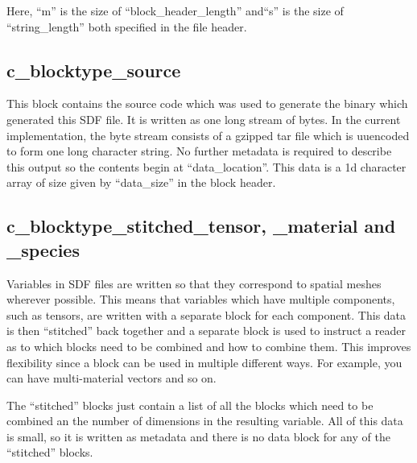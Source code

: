 \documentclass[12pt]{article}
\begin{document}
Here, ``m'' is the size of ``block\_header\_length'' and``s'' is the size of
``string\_length'' both specified in the file header.

\subsection{c\_blocktype\_source}

This block contains the source code which was used to generate the binary
which generated this SDF file. It is written as one long stream of bytes.
In the current implementation, the byte stream consists of a gzipped
tar file which is uuencoded to form one long character string. No further
metadata is required to describe this output so the contents begin at
``data\_location''. This data is a 1d character array of size given by
``data\_size'' in the block header.


\subsection{c\_blocktype\_stitched\_tensor, \_material and \_species}

Variables in SDF files are written so that they correspond to spatial meshes
wherever possible. This means that variables which have multiple components,
such as tensors, are written with a separate block for each component. This
data is then ``stitched'' back together and a separate block is used to
instruct a reader as to which blocks need to be combined and how to combine
them. This improves flexibility since a block can be used in multiple different
ways. For example, you can have multi-material vectors and so on.

The ``stitched'' blocks just contain a list of all the blocks which need to
be combined an the number of dimensions in the resulting variable.
All of this data is small, so it is written as metadata and there is no
data block for any of the ``stitched'' blocks.
\end{document}
